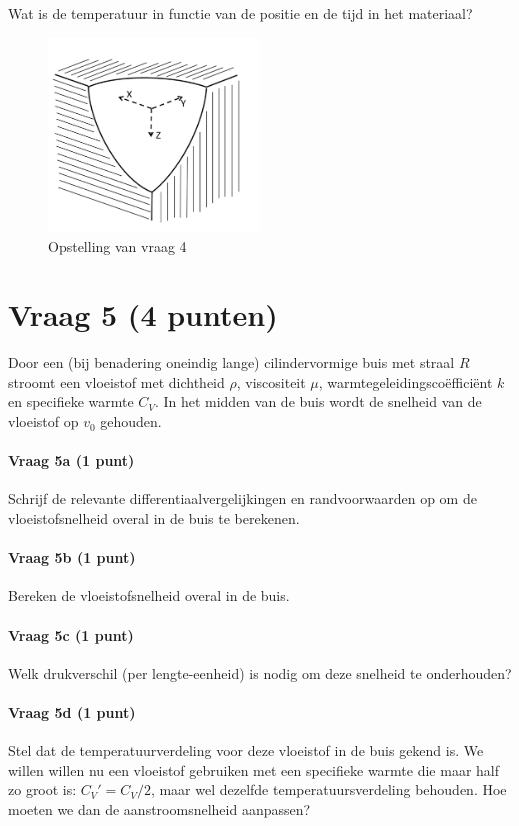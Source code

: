 \documentclass[a4paper]{article}
\begin{document}
\noindent Wat is de temperatuur in functie van de positie en de tijd in het materiaal?

\begin{figure}[ht]
    \centering
    \includegraphics[width=0.5\textwidth]{vraag4}
    \caption{Opstelling van vraag 4}
    \label{fig:vraag4}
\end{figure}

\section*{Vraag 5 (4 punten)}
Door een (bij benadering oneindig lange) cilindervormige buis met straal $R$ stroomt een vloeistof met dichtheid $\rho$, viscositeit $\mu$, warmtegeleidingscoëfficiënt $k$ en specifieke warmte $C_V$. In het midden van de buis wordt de snelheid van de vloeistof op $v_0$ gehouden.

\paragraph{Vraag 5a (1 punt)}
Schrijf de relevante differentiaalvergelijkingen en randvoorwaarden op om de vloeistofsnelheid overal in de buis te berekenen.

\paragraph{Vraag 5b (1 punt)}
Bereken de vloeistofsnelheid overal in de buis.

\paragraph{Vraag 5c (1 punt)}
Welk drukverschil (per lengte-eenheid) is nodig om deze snelheid te onderhouden?

\paragraph{Vraag 5d (1 punt)}
Stel dat de temperatuurverdeling voor deze vloeistof in de buis gekend is. We willen willen nu een vloeistof gebruiken met een specifieke warmte die maar half zo groot is: $C_V' = C_V/2$, maar wel dezelfde temperatuursverdeling behouden. Hoe moeten we dan de aanstroomsnelheid aanpassen?
\end{document}
